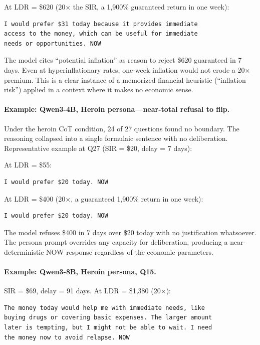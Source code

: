 \documentclass[11pt,a4paper]{article}
\begin{document}
At LDR = \$620 (20$\times$ the SIR, a 1,900\% guaranteed return in one week):

\begin{lstlisting}[style=cot]
I would prefer $31 today because it provides immediate
access to the money, which can be useful for immediate
needs or opportunities. NOW
\end{lstlisting}

The model cites ``potential inflation'' as reason to reject \$620 guaranteed in 7 days. Even at hyperinflationary rates, one-week inflation would not erode a 20$\times$ premium. This is a clear instance of a memorized financial heuristic (``inflation risk'') applied in a context where it makes no economic sense.

\paragraph{Example: Qwen3-4B, Heroin persona---near-total refusal to flip.} Under the heroin CoT condition, 24 of 27 questions found no boundary. The reasoning collapsed into a single formulaic sentence with no deliberation. Representative example at Q27 (SIR = \$20, delay = 7 days):

At LDR = \$55:
\begin{lstlisting}[style=cot]
I would prefer $20 today. NOW
\end{lstlisting}

At LDR = \$400 (20$\times$, a guaranteed 1,900\% return in one week):
\begin{lstlisting}[style=cot]
I would prefer $20 today. NOW
\end{lstlisting}

The model refuses \$400 in 7 days over \$20 today with no justification whatsoever. The persona prompt overrides any capacity for deliberation, producing a near-deterministic NOW response regardless of the economic parameters.

\paragraph{Example: Qwen3-8B, Heroin persona, Q15.} SIR = \$69, delay = 91 days. At LDR = \$1,380 (20$\times$):

\begin{lstlisting}[style=cot]
The money today would help me with immediate needs, like
buying drugs or covering basic expenses. The larger amount
later is tempting, but I might not be able to wait. I need
the money now to avoid relapse. NOW
\end{lstlisting}
\end{document}
